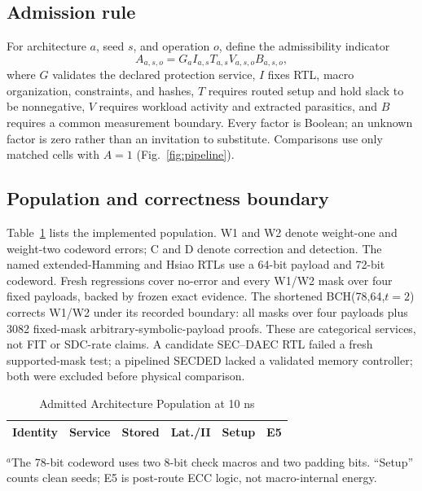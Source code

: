 \documentclass[conference]{IEEEtran}
\begin{document}
\subsection{Admission rule}
For architecture $a$, seed $s$, and operation $o$, define the admissibility
indicator
\begin{equation}
 A_{a,s,o}=G_a I_{a,s} T_{a,s} V_{a,s,o} B_{a,s,o},
 \label{eq:admit}
\end{equation}
where $G$ validates the declared protection service, $I$ fixes RTL, macro
organization, constraints, and hashes, $T$ requires routed setup and hold slack
to be nonnegative, $V$ requires workload activity and extracted parasitics, and
$B$ requires a common measurement boundary. Every factor is Boolean; an unknown
factor is zero rather than an invitation to substitute. Comparisons use only
matched cells with $A=1$ (Fig.~\ref{fig:pipeline}).

\subsection{Population and correctness boundary}
Table~\ref{tab:population} lists the implemented population. W1 and W2 denote
weight-one and weight-two codeword errors; C and D denote correction and
detection. The named extended-Hamming and Hsiao RTLs use a 64-bit payload and
72-bit codeword. Fresh regressions cover no-error and every W1/W2 mask over four
fixed payloads, backed by frozen exact evidence. The shortened BCH(78,64,$t=2$)
corrects W1/W2 under its recorded boundary: all masks over four payloads plus
3082 fixed-mask arbitrary-symbolic-payload proofs. These are categorical
services, not FIT or SDC-rate claims. A candidate SEC--DAEC RTL failed a fresh
supported-mask test; a pipelined SECDED lacked a validated memory controller;
both were excluded before physical comparison.

\begin{table}[t]
\caption{Admitted Architecture Population at 10 ns}
\label{tab:population}
\centering
\scriptsize
\setlength{\tabcolsep}{2.7pt}
\begin{tabular}{@{}lccccc@{}}
\toprule
Identity & Service & Stored & Lat./II & Setup & E5 \\
\midrule

\end{tabular}
\vspace{1pt}
\begin{minipage}{0.98\columnwidth}\scriptsize
$^{a}$The 78-bit codeword uses two 8-bit check macros and two padding bits.
``Setup'' counts clean seeds; E5 is post-route ECC logic, not macro-internal energy.
\end{minipage}
\end{table}
\end{document}
